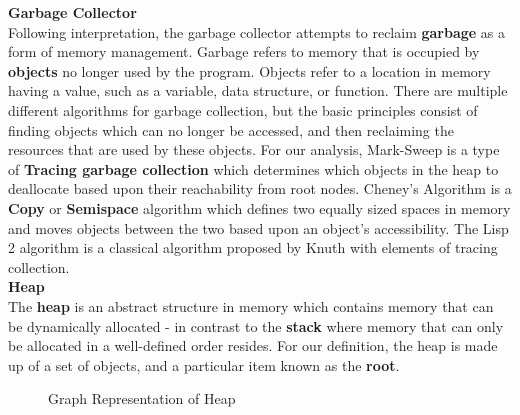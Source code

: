 \documentclass[11pt,leqno]{article}
\newcommand{\mydef}[1]{\textbf{#1}}
\begin{document}
\textbf{Garbage Collector}\\
Following interpretation, the garbage collector attempts to reclaim \mydef{garbage} as a form of memory management. Garbage refers to memory that is occupied by \mydef{objects} no longer used by the program. Objects refer to a location in memory having a value, such as a variable, data structure, or function. There are multiple different algorithms for garbage collection, but the basic principles consist of finding objects which can no longer be accessed, and then reclaiming the resources that are used by these objects. For our analysis, Mark-Sweep is a type of \mydef{Tracing garbage collection} which determines which objects in the heap to deallocate based upon their reachability from root nodes. Cheney's Algorithm is a \mydef{Copy} or \mydef{Semispace} algorithm which defines two equally sized spaces in memory and moves objects between the two based upon an object's accessibility. The Lisp 2 algorithm is a classical algorithm proposed by Knuth with elements of tracing collection.\\

\noindent
\textbf{Heap}\\
The \mydef{heap} is an abstract structure in memory which contains memory that can be dynamically allocated - in contrast to the \mydef{stack} where memory that can only be allocated in a well-defined order resides. For our definition, the heap is made up of a set of objects, and a particular item known as the \mydef{root}. 

\begin{figure}[H]
	\centering
	\caption{Graph Representation of Heap}
	\label{fig:heapex}
\end{figure}
\end{document}
